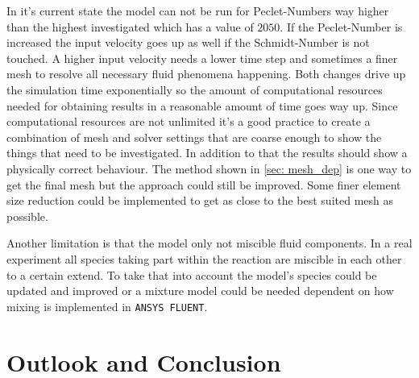 \documentclass[../thesis.tex]{subfiles}
\begin{document}
In it's current state the model can not be run for Peclet-Numbers way higher than the highest investigated which has a value of $2050$. If the Peclet-Number is increased the input velocity goes up as well if the Schmidt-Number is not touched. A higher input velocity needs a lower time step and sometimes a finer mesh to resolve all necessary fluid phenomena happening. Both changes drive up the simulation time exponentially so the amount of computational resources needed for obtaining results in a reasonable amount of time goes way up. Since computational resources are not unlimited it's a good practice to create a combination of mesh and solver settings that are coarse enough to show the things that need to be investigated. In addition to that the results should show a physically correct behaviour. The method shown in \autoref{sec: mesh_dep} is one way to get the final mesh but the approach could still be improved. Some finer element size reduction could be implemented to get as close to the best suited mesh as possible. 

Another limitation is that the model only not miscible fluid components. In a real experiment all species taking part within the reaction are miscible in each other to a certain extend. To take that into account the model's species could be updated and improved or a mixture model could be needed dependent on how mixing is implemented in \texttt{ANSYS FLUENT}. 

\chapter{Outlook and Conclusion}
\label{chp:out_con}
\end{document}
